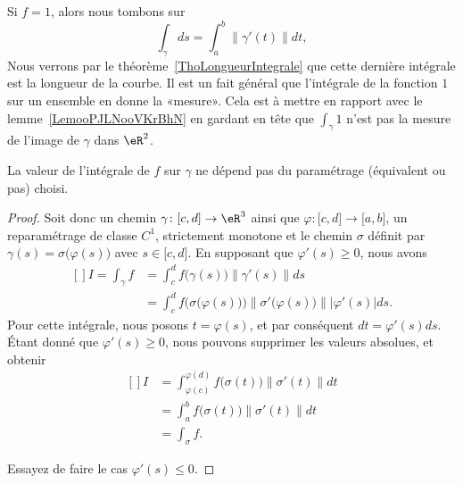 \begin{remark}
	Si \( f=1\), alors nous tombons sur
	\begin{equation}
		\int_{\gamma}ds=\int_a^b\| \gamma'(t) \|dt,
	\end{equation}
	Nous verrons par le théorème~\ref{ThoLongueurIntegrale} que cette dernière intégrale est la longueur de la courbe. Il est un fait général que l'intégrale de la fonction \( 1\) sur un ensemble en donne la «mesure».
	Cela est à mettre en rapport avec le lemme~\ref{LemooPJLNooVKrBhN} en gardant en tête que \( \int_{\gamma}1\) n'est pas la mesure de l'image de \( \gamma\) dans \( \eR^2\).
\end{remark}

\begin{proposition}
	La valeur de l'intégrale de \( f\) sur \( \gamma\) ne dépend pas du paramétrage (équivalent ou pas) choisi.
\end{proposition}

\begin{proof}
	Soit donc un chemin \( \gamma\colon \mathopen[ c , d \mathclose]\to \eR^3\) ainsi que \( \varphi\colon \mathopen[ c , d \mathclose]\to \mathopen[ a , b \mathclose]\), un reparamétrage de classe \( C^1\), strictement monotone et le chemin \( \sigma\) définit par \( \gamma(s)=\sigma\big( \varphi(s) \big)\) avec \( s\in\mathopen[ c , d \mathclose]\). En supposant que \( \varphi'(s)\geq 0\), nous avons
	\begin{equation}
		\begin{aligned}[]
			I=\int_{\gamma}f & =\int_c^df\big( \gamma(s) \big)\| \gamma'(s) \|ds                                                       \\
			                 & =\int_c^df\Big( \sigma\big( \varphi(s) \big) \Big)\| \sigma'\big( \varphi(s) \big) \| |\varphi'(s) |ds.
		\end{aligned}
	\end{equation}
	Pour cette intégrale, nous posons \( t=\varphi(s)\), et par conséquent \( dt=\varphi'(s)ds\). Étant donné que \( \varphi'(s)\geq 0\), nous pouvons supprimer les valeurs absolues, et obtenir
	\begin{equation}
		\begin{aligned}[]
			I & =\int_{\varphi(c)}^{\varphi(d)}f\big( \sigma(t) \big)\| \sigma'(t) \|dt \\
			  & =\int_a^bf\big( \sigma(t) \big)\| \sigma'(t) \|dt                       \\
			  & =\int_{\sigma}f.
		\end{aligned}
	\end{equation}

	Essayez de faire le cas \( \varphi'(s)\leq 0\).
\end{proof}

